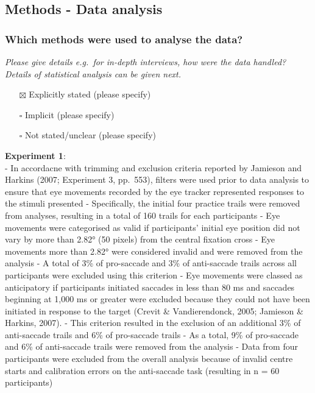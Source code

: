 \documentclass[
  doc, a4paper]{apa7}
\providecommand{\tightlist}{%
  \setlength{\itemsep}{0pt}\setlength{\parskip}{0pt}}
\begin{document}
\subsection{Methods - Data analysis}\label{methods---data-analysis}

\subsubsection{Which methods were used to analyse the data?}\label{which-methods-were-used-to-analyse-the-data}

\emph{Please give details e.g.~for in-depth interviews, how were the data handled? Details of statistical analysis can be given next.}

\begin{itemize}
\tightlist
\item[$\boxtimes$]
  Explicitly stated (please specify)
\item[$\square$]
  Implicit (please specify)
\item[$\square$]
  Not stated/unclear (please specify)
\end{itemize}

\textbf{Experiment 1}:\\
- In accordacne with trimming and exclusion criteria reported by Jamieson and Harkins (2007; Experiment 3, pp.~553), filters were used prior to data analysis to ensure that eye movements recorded by the eye tracker represented responses to the stimuli presented
- Specifically, the initial four practice trails were removed from analyses, resulting in a total of 160 trails for each participants
- Eye movements were categorised as valid if participants' initial eye position did not vary by more than 2.82° (50 pixels) from the central fixation cross
- Eye movements more than 2.82° were considered invalid and were removed from the analysis
- A total of 3\% of pro-saccade and 3\% of anti-saccade trails across all participants were excluded using this criterion
- Eye movements were classed as anticipatory if participants initiated saccades in less than 80 ms and saccades beginning at 1,000 ms or greater were excluded because they could not have been initiated in response to the target (Crevit \& Vandierendonck, 2005; Jamieson \& Harkins, 2007).
- This criterion resulted in the exclusion of an additional 3\% of anti-saccade trails and 6\% of pro-saccade trails
- As a total, 9\% of pro-saccade and 6\% of anti-saccade trails were removed from the analysis
- Data from four participants were excluded from the overall analysis because of invalid centre starts and calibration errors on the anti-saccade task (resulting in n = 60 participants)
\end{document}
